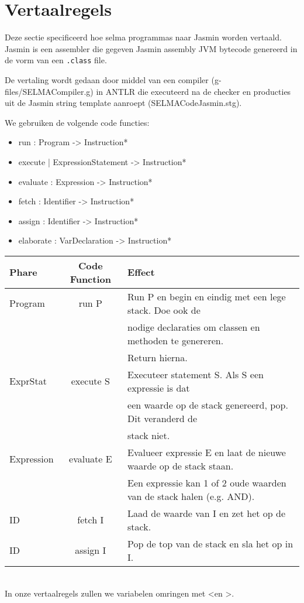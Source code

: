 \documentclass[]{article}
\begin{document}

\newpage
\section{Vertaalregels}
Deze sectie specificeerd hoe selma programmas naar Jasmin worden vertaald. Jasmin is een assembler die gegeven Jasmin assembly JVM bytecode genereerd in de vorm van een \texttt{.class} file.

De vertaling wordt gedaan door middel van een compiler (g-files/SELMACompiler.g) in ANTLR die executeerd na de checker en producties uit de Jasmin string template aanroept (SELMACodeJasmin.stg).

We gebruiken de volgende code functies:

\begin{itemize}
	\item run       : Program     -> Instruction*
	\item execute   | ExpressionStatement -> Instruction*
 	\item evaluate  : Expression  -> Instruction*
 	\item fetch		  : Identifier  -> Instruction*
 	\item assign    : Identifier   -> Instruction*
 	\item elaborate : VarDeclaration -> Instruction*
\end{itemize}

\begin{tabular}{| l | c | l |}
	Phare   & Code Function & Effect \\ 
	\hline \hline
  Program & run P       & Run P en begin en eindig met een lege stack. Doe ook de \\
  &&                      nodige declaraties om classen en methoden te genereren. \\
  &&											 Return hierna.\\ 
  \hline
  ExprStat & execute S  & Executeer statement S. Als S een expressie is dat \\
  && 										 een waarde op de stack genereerd, pop. Dit veranderd de \\
  &&											 stack niet. \\ 
  \hline
  Expression & evaluate E & Evalueer expressie E en laat de nieuwe waarde op de stack staan.\\
  &&												 Een expressie kan 1 of 2 oude waarden van de stack halen (e.g. AND). \\ 
  \hline
  ID				   & fetch I    & Laad de waarde van I en zet het op de stack. \\
  \hline
  ID					 & assign I   & Pop de top van de stack en sla het op in I. \\
  \hline
\end{tabular}
\\
In onze vertaalregels zullen we variabelen omringen met \textless en \textgreater.
\end{document}
